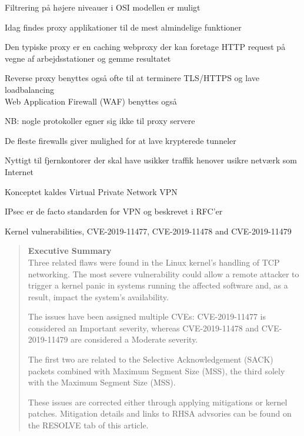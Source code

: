 \documentclass[Screen16to9,17pt]{foils}
\begin{document}

\begin{list1}
\item Filtrering på højere niveauer i OSI modellen er muligt
\item Idag findes proxy applikationer til de mest almindelige
  funktioner
\item Den typiske proxy er en caching webproxy der kan foretage HTTP
  request på vegne af arbejdsstationer og gemme resultatet
\item Reverse proxy benyttes også ofte til at terminere TLS/HTTPS og lave loadbalancing\\
Web Application Firewall (WAF) benyttes også
\item NB: nogle protokoller egner sig ikke til proxy servere
\end{list1}



\begin{list1}
\item De fleste firewalls giver mulighed for at lave krypterede
  tunneler
\item Nyttigt til fjernkontorer der skal have usikker traffik henover
  usikre netværk som Internet
\item Konceptet kaldes Virtual Private Network VPN
\item IPsec er de facto standarden for VPN og beskrevet i RFC'er
\end{list1}




Kernel vulnerabilities, CVE-2019-11477, CVE-2019-11478 and CVE-2019-11479

\begin{quote}\footnotesize{\bf
Executive Summary}\\
Three related flaws were found in the Linux kernel’s handling of TCP networking.  The most severe vulnerability could allow a remote attacker to trigger a kernel panic in systems running the affected software and, as a result, impact the system’s availability.

The issues have been assigned multiple CVEs: CVE-2019-11477 is considered an Important severity, whereas CVE-2019-11478 and CVE-2019-11479 are considered a Moderate severity.

The first two are related to the Selective Acknowledgement (SACK) packets combined with Maximum Segment Size (MSS), the third solely with the Maximum Segment Size (MSS).

These issues are corrected either through applying mitigations or kernel patches.  Mitigation details and links to RHSA advsories can be found on the RESOLVE tab of this article.
\end{quote}
\end{document}
